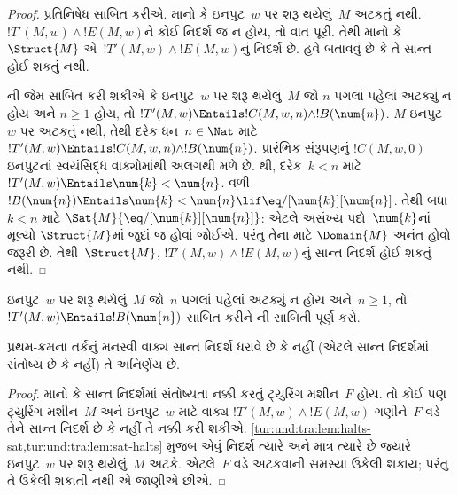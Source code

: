 \begin{proof}
  પ્રતિનિષેધ સાબિત કરીએ. માનો કે ઇનપુટ~$w$
  પર શરૂ થયેલું~$M$ અટકતું નથી.
  $!T'(M,w) \land !E(M,w)$ને કોઈ નિદર્શ
  જ ન હોય, તો વાત પૂરી. તેથી માનો કે
  $\Struct{M}$ એ~$!T'(M,w) \land !E(M, w)$નું
  નિદર્શ છે. હવે બતાવવું છે કે તે સાન્ત હોઈ
  શકતું નથી.

  ની જેમ સાબિત કરી
  શકીએ કે ઇનપુટ~$w$ પર શરૂ થયેલું~$M$ જો
  $n$ પગલાં પહેલાં અટક્યું ન હોય અને
  $n \ge 1$ હોય, તો $!T'(M,w) \Entails
  !C(M, w, n) \land !B(\num{n})$.
  $M$ ઇનપુટ~$w$ પર અટકતું નથી, તેથી
  દરેક ધન~$n \in \Nat$ માટે
  $!T'(M,w) \Entails !C(M, w, n) \land
  !B(\num{n})$. પ્રારંભિક સંરૂપણનું
  $!C(M,w,0)$ ઇનપુટનાં સ્વયંસિદ્ધ વાક્યોમાંથી
  અલગથી મળે છે.
  થી, દરેક~$k < n$
  માટે $!T'(M,w) \Entails \num{k} < \num{n}$.
  વળી $!B(\num{n}) \Entails
  \num{k} < \num{n} \lif
  \eq/[\num{k}][\num{n}]$. તેથી બધા
  $k < n$ માટે
  $\Sat{M}{\eq/[\num{k}][\num{n}]}$:
  એટલે અસંખ્ય પદો~$\num{k}$નાં મૂલ્યો
  $\Struct{M}$માં જુદાં જ હોવાં જોઈએ.
  પરંતુ તેના માટે $\Domain{M}$ અનંત હોવો
  જરૂરી છે. તેથી~$\Struct{M}$,
  $!T'(M,w) \land !E(M, w)$નું સાન્ત નિદર્શ
  હોઈ શકતું નથી.
\end{proof}

\begin{prob}
  ઇનપુટ~$w$ પર શરૂ થયેલું~$M$ જો~$n$
  પગલાં પહેલાં અટક્યું ન હોય અને~$n \ge 1$,
  તો $!T'(M,w) \Entails !B(\num{n})$
  સાબિત કરીને
  ની સાબિતી
  પૂર્ણ કરો.
\end{prob}

\begin{thm}[ટ્રાખ્ટેનબ્રોટનું પ્રમેય]
  પ્રથમ-ક્રમના તર્કનું મનસ્વી વાક્ય સાન્ત
  નિદર્શ ધરાવે છે કે નહીં (એટલે સાન્ત
  નિદર્શમાં સંતોષ્ય છે કે નહીં) તે અનિર્ણેય છે.
\end{thm}

\begin{proof}
  માનો કે સાન્ત નિદર્શમાં સંતોષ્યતા નક્કી કરતું
  ટ્યુરિંગ મશીન~$F$ હોય. તો કોઈ પણ ટ્યુરિંગ
  મશીન~$M$ અને ઇનપુટ~$w$ માટે વાક્ય
  $!T'(M,w) \land !E(M,w)$ ગણીને~$F$ વડે
  તેને સાન્ત નિદર્શ છે કે નહીં તે નક્કી કરી
  શકીએ. \cref{tur:und:tra:lem:halts-sat,tur:und:tra:lem:sat-halts}
  મુજબ એવું નિદર્શ ત્યારે અને માત્ર ત્યારે છે
  જ્યારે ઇનપુટ~$w$ પર શરૂ થયેલું~$M$ અટકે.
  એટલે~$F$ વડે અટકવાની સમસ્યા ઉકેલી શકાય;
  પરંતુ તે ઉકેલી શકાતી નથી એ જાણીએ છીએ.
\end{proof}

